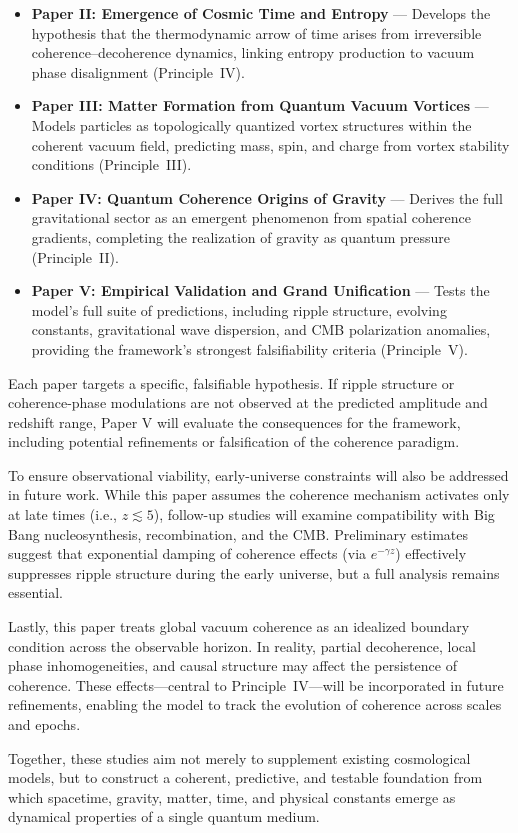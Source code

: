 \begin{itemize}
    \item \textbf{Paper II: Emergence of Cosmic Time and Entropy} — Develops the hypothesis that the thermodynamic arrow of time arises from irreversible coherence–decoherence dynamics, linking entropy production to vacuum phase disalignment (Principle~IV).

    \item \textbf{Paper III: Matter Formation from Quantum Vacuum Vortices} — Models particles as topologically quantized vortex structures within the coherent vacuum field, predicting mass, spin, and charge from vortex stability conditions (Principle~III).

    \item \textbf{Paper IV: Quantum Coherence Origins of Gravity} — Derives the full gravitational sector as an emergent phenomenon from spatial coherence gradients, completing the realization of gravity as quantum pressure (Principle~II).

    \item \textbf{Paper V: Empirical Validation and Grand Unification} — Tests the model’s full suite of predictions, including ripple structure, evolving constants, gravitational wave dispersion, and CMB polarization anomalies, providing the framework’s strongest falsifiability criteria (Principle~V).
\end{itemize}

Each paper targets a specific, falsifiable hypothesis. If ripple structure or coherence-phase modulations are not observed at the predicted amplitude and redshift range, Paper V will evaluate the consequences for the framework, including potential refinements or falsification of the coherence paradigm.

To ensure observational viability, early-universe constraints will also be addressed in future work. While this paper assumes the coherence mechanism activates only at late times (i.e., \( z \lesssim 5 \)), follow-up studies will examine compatibility with Big Bang nucleosynthesis, recombination, and the CMB. Preliminary estimates suggest that exponential damping of coherence effects (via \( e^{-\gamma z} \)) effectively suppresses ripple structure during the early universe, but a full analysis remains essential.

Lastly, this paper treats global vacuum coherence as an idealized boundary condition across the observable horizon. In reality, partial decoherence, local phase inhomogeneities, and causal structure may affect the persistence of coherence. These effects—central to Principle~IV—will be incorporated in future refinements, enabling the model to track the evolution of coherence across scales and epochs.

Together, these studies aim not merely to supplement existing cosmological models, but to construct a coherent, predictive, and testable foundation from which spacetime, gravity, matter, time, and physical constants emerge as dynamical properties of a single quantum medium.
